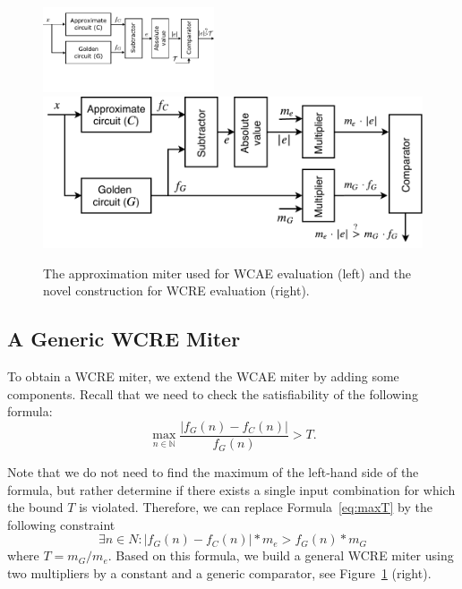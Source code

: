 \documentclass[runningheads]{llncs}
\begin{document}
\begin{figure}[t]
    \centering
    \includegraphics[width=0.45\textwidth]{img/excel/miter_wcae.pdf}
    \includegraphics[width=0.53\linewidth]{img/excel/miter_wcre.pdf}
    \vspace{-1em}
    \caption{The approximation miter used for WCAE evaluation (left) and 
    the novel construction for WCRE evaluation (right).}
    \label{fig:miter_wcae}
    \vspace{-1em}
\end{figure}
 
\subsection{A Generic WCRE Miter}

To obtain a WCRE miter, we extend the WCAE miter by adding some components.
Recall that we need to check the satisfiability  of the following formula:
%
\begin{equation} \label{eq:maxT} \max_{n \in \mathbb{N}} \frac{\left|f_{G}(n) -
f_{C}(n)\right|}{f_{G}(n)} > T.  \end{equation} 

Note that we do not need to find the maximum of the left-hand side of the
formula, but rather determine if there exists a single input combination for
which the bound $T$ is violated. Therefore, we can replace
Formula~\ref{eq:maxT} by the following constraint
%
\begin{equation} \label{eq:wcre_final} \exists n \in N: \left|f_{G}(n) -
f_{C}(n)\right| * m_{e} > f_{G}(n) * m_{G} \end{equation}
%
where $T = m_{G} / m_{e}$. Based on this formula, we build a general WCRE miter
using  two multipliers by a constant and a generic comparator, see
Figure~\ref{fig:miter_wcae} (right).
\end{document}
